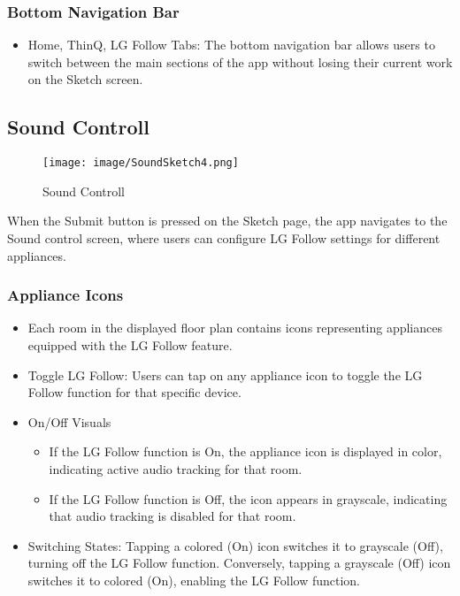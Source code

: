 \documentclass[conference]{IEEEtran}
\begin{document}
\subsubsection{Bottom Navigation Bar}
\begin{itemize}
    \item Home, ThinQ, LG Follow Tabs: The bottom navigation bar allows users to switch between the main sections of the app without losing their current work on the Sketch screen.\\
\end{itemize}

\subsection{Sound Controll}

\begin{figure}[h!]
    \centering
    \texttt{[image: image/SoundSketch4.png]}
    \caption{Sound Controll}
    \label{fig:enter-label}
\end{figure}

\noindent When the Submit button is pressed on the Sketch page, the app navigates to the Sound control screen, where users can configure LG Follow settings for different appliances.

\subsubsection{Appliance Icons}
\begin{itemize}
    \item  Each room in the displayed floor plan contains icons representing appliances equipped with the LG Follow feature.\\
    \item Toggle LG Follow: Users can tap on any appliance icon to toggle the LG Follow function for that specific device.\\
    \item On/Off Visuals
\begin{itemize}
    \item If the LG Follow function is On, the appliance icon is displayed in color, indicating active audio tracking for that room.\\
    \item If the LG Follow function is Off, the icon appears in grayscale, indicating that audio tracking is disabled for that room.\\
\end{itemize}
\end{itemize}
\begin{itemize}
    \item Switching States: Tapping a colored (On) icon switches it to grayscale (Off), turning off the LG Follow function. Conversely, tapping a grayscale (Off) icon switches it to colored (On), enabling the LG Follow function.\\
\end{itemize}
\end{document}
